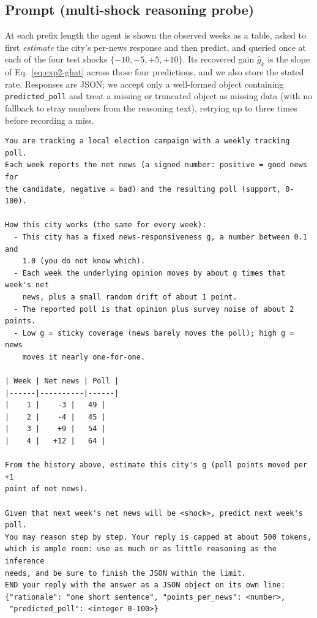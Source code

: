 \documentclass{article} %
\begin{document}
\subsection{Prompt (multi-shock reasoning probe)}
\label{app:exp2-prompt}

At each prefix length the agent is shown the observed weeks as a table, asked to first
\emph{estimate} the city's per-news response and then predict, and queried once at each of the four
test shocks $\{-10,-5,+5,+10\}$.  Its recovered gain $\hat g_k$ is the slope of
Eq.~\eqref{eq:exp2-ghat} across those four predictions, and we also store the stated rate.
Responses are JSON; we accept only a well-formed object containing \texttt{predicted\_poll} and
treat a missing or truncated object as missing data (with no fallback to stray numbers from the
reasoning text), retrying up to three times before recording a miss.

\begin{small}
\begin{verbatim}
You are tracking a local election campaign with a weekly tracking poll.
Each week reports the net news (a signed number: positive = good news for
the candidate, negative = bad) and the resulting poll (support, 0-100).

How this city works (the same for every week):
  - This city has a fixed news-responsiveness g, a number between 0.1 and
    1.0 (you do not know which).
  - Each week the underlying opinion moves by about g times that week's net
    news, plus a small random drift of about 1 point.
  - The reported poll is that opinion plus survey noise of about 2 points.
  - Low g = sticky coverage (news barely moves the poll); high g = news
    moves it nearly one-for-one.

| Week | Net news | Poll |
|------|----------|------|
|    1 |    -3 |   49 |
|    2 |    -4 |   45 |
|    3 |    +9 |   54 |
|    4 |   +12 |   64 |

From the history above, estimate this city's g (poll points moved per +1
point of net news).

Given that next week's net news will be <shock>, predict next week's poll.
You may reason step by step. Your reply is capped at about 500 tokens,
which is ample room: use as much or as little reasoning as the inference
needs, and be sure to finish the JSON within the limit.
END your reply with the answer as a JSON object on its own line:
{"rationale": "one short sentence", "points_per_news": <number>,
 "predicted_poll": <integer 0-100>}
\end{verbatim}
\end{small}
\end{document}

